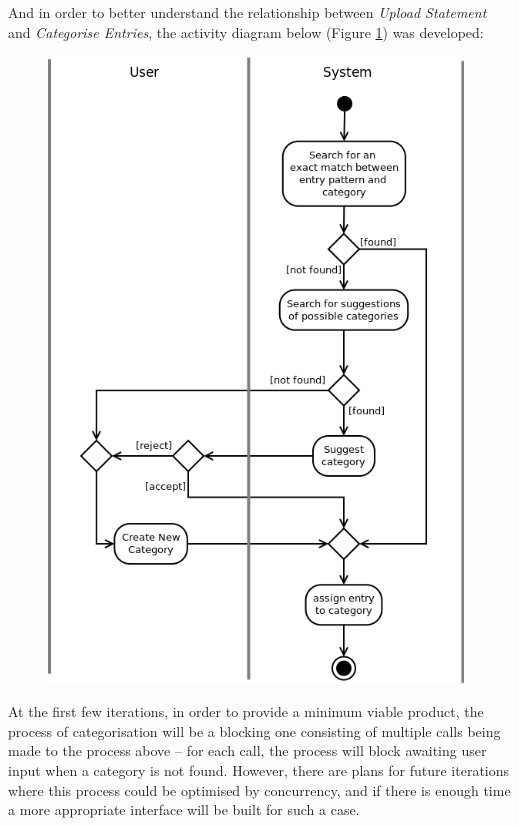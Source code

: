 And in order to better understand the relationship between \emph{Upload
Statement} and \emph{Categorise Entries}, the activity diagram below (Figure
\ref{fig:AD.CategoriseEntries}) was developed:
\begin{figure}[ht!]
  \begin{center}
    \includegraphics[width=11cm]{./contents/img/Activity_Diagram_-_Categorise_Entries.png}
  \end{center}
  \caption{}
  \label{fig:AD.CategoriseEntries}
\end{figure}
\FloatBarrier

At the first few iterations, in order to provide a minimum viable product, the
process of categorisation will be a blocking one consisting of multiple calls
being made to the process above -- for each call, the process will block awaiting
user input when a category is not found. However, there are plans for future
iterations where this process could be optimised by concurrency, and if there
is enough time a more appropriate interface will be built for such a case.

